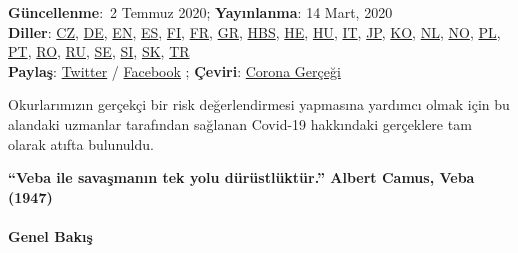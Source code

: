 \textbf{Güncellenme}:~2 Temmuz 2020; \textbf{Yayınlanma}: 14 Mart,
2020\\
\textbf{Diller}: \href{https://swprs.org/fakta-o-covid-19/}{CZ},
\href{https://swprs.org/covid-19-hinweis-ii/}{DE},
\href{https://swprs.org/a-swiss-doctor-on-covid-19/}{EN},
\href{https://swprs.org/hechos-sobre-covid-19/}{ES},
\href{https://swprs.org/faktoja-covid-19sta/}{FI},
\href{https://swprs.org/coronavirus-un-medecin-suisse-parle/}{FR},
\href{https://swprs.org/facts-about-covid19-greek/}{GR},
\href{https://swprs.org/covid-19-cinjenice/}{HBS},
\href{https://yanivhamo.com/facts-about-covid-19-hebrew/}{HE},
\href{https://swprs.org/egy-svajci-orvos-a-covid-19-rol/}{HU},
\href{https://swprs.org/un-medico-svizzero-su-covid-19/}{IT},
\href{https://swprs.org/covid19-facts-japanese/}{JP},
\href{https://swprs.org/covid19-korean/}{KO},
\href{https://www.globalinfo.nl/Achtergrond/een-kritische-kijk-op-het-coronabeleid-transparantie-in-tijden-van-crisis}{NL},
\href{https://midtifleisen.wordpress.com/2020/03/14/en-sveitsisk-lege-om-covid-19/}{NO},
\href{https://swprs.org/szwajcarski-lekarz-o-covid-19/}{PL},
\href{https://swprs.org/fatos-sobre-covid-19/}{PT},
\href{https://swprs.org/informatii-despre-covid-19/}{RO},
\href{https://swprs.org/\%d0\%bd\%d0\%b0-\%d0\%ba\%d0\%be\%d0\%b2\%d0\%b8\%d0\%b4-19/}{RU},
\href{https://swprs.org/fakta-om-covid-19/}{SE},
\href{http://www.ninamvseeno.org/pregled-clanka.aspx?naslov=pomembne-informacije-o-novem-koronavirusu-covid-19\&id=148}{SI},
\href{https://alatyr.sk/covid-19_swiss_propaganda_research.htm}{SK},
\href{https://swprs.org/isvicreli-bir-doktordan-kovid-19-uezerine/}{TR}\\
\textbf{Paylaş}:
\href{https://twitter.com/intent/tweet?url=https://swprs.org/a-swiss-doctor-on-covid-19/}{Twitter}
/
\href{https://www.facebook.com/share.php?u=https://swprs.org/a-swiss-doctor-on-covid-19/}{Facebook}
; \textbf{Çeviri}: \href{https://www.coronagercegi.com/}{Corona Gerçeği}

Okurlarımızın gerçekçi bir risk değerlendirmesi yapmasına yardımcı olmak
için bu alandaki uzmanlar tarafından sağlanan Covid-19 hakkındaki
gerçeklere tam olarak atıfta bulunuldu.

\textbf{``Veba ile savaşmanın tek yolu dürüstlüktür.'' Albert Camus,
Veba (1947)}

\hypertarget{genel-bakux131ux15f}{%
\paragraph{Genel Bakış}\label{genel-bakux131ux15f}}

